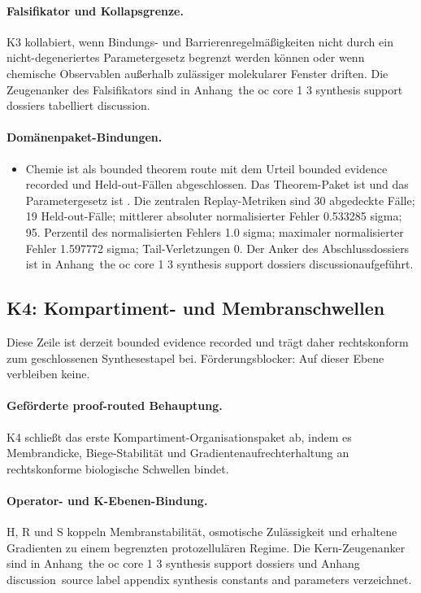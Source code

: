 \paragraph{Falsifikator und Kollapsgrenze.}
K3 kollabiert, wenn Bindungs- und Barrierenregelmäßigkeiten nicht durch ein nicht-degeneriertes Parametergesetz begrenzt werden können oder wenn chemische Observablen außerhalb zulässiger molekularer Fenster driften.
Die Zeugenanker des Falsifikators sind in Anhang~the oc core 1 3 synthesis support dossiers tabelliert discussion.

\paragraph{Domänenpaket-Bindungen.}
\begin{itemize}[leftmargin=1.6em,nosep]
\item Chemie ist als bounded theorem route mit dem Urteil bounded evidence recorded und  Held-out-Fällen abgeschlossen. Das Theorem-Paket ist  und das Parametergesetz ist . Die zentralen Replay-Metriken sind 30 abgedeckte Fälle; 19 Held-out-Fälle; mittlerer absoluter normalisierter Fehler 0.533285 sigma; 95. Perzentil des normalisierten Fehlers 1.0 sigma; maximaler normalisierter Fehler 1.597772 sigma; Tail-Verletzungen 0. Der Anker des Abschlussdossiers ist in Anhang~the oc core 1 3 synthesis support dossiers discussionaufgeführt.
\end{itemize}

\subsection{K4: Kompartiment- und Membranschwellen}
\label{sec:oc-core-1-3-synthesis-k4}
Diese Zeile ist derzeit bounded evidence recorded und trägt daher rechtskonform zum geschlossenen Synthesestapel bei.
Förderungsblocker: Auf dieser Ebene verbleiben keine.

\paragraph{Geförderte proof-routed Behauptung.}
K4 schließt das erste Kompartiment-Organisationspaket ab, indem es Membrandicke, Biege-Stabilität und Gradientenaufrechterhaltung an rechtskonforme biologische Schwellen bindet.

\paragraph{Operator- und K-Ebenen-Bindung.}
H, R und S koppeln Membranstabilität, osmotische Zulässigkeit und erhaltene Gradienten zu einem begrenzten protozellulären Regime.
Die Kern-Zeugenanker sind in Anhang~the oc core 1 3 synthesis support dossiers und Anhang discussion~source label appendix synthesis constants and parameters verzeichnet.

